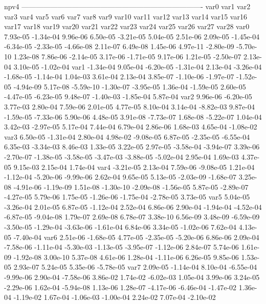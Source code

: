 npv4
----------------------------------------------------------------------------
var0 var1 var2 var3 var4 var5 var6 var7 var8 var9 var10 var11 var12 var13 var14 var15 var16 var17 var18 var19 var20 var21 var22 var23 var24 var25 var26 var27 var28 
var0  7.93e-05 -1.34e-04  9.96e-06  6.50e-05 -3.21e-05  5.04e-05  2.51e-06  2.09e-05 -1.45e-04 -6.34e-05 -2.33e-05 -4.66e-08  2.11e-07  6.49e-08  1.45e-06  4.97e-11 -2.80e-09 -5.70e-10  1.23e-08  7.86e-06 -2.14e-05  3.17e-06 -1.71e-05  9.17e-06  1.21e-05 -2.50e-07  2.13e-04  3.10e-05 -1.02e-04
var1 -1.34e-04  9.05e-04 -6.20e-05 -1.31e-04  2.13e-04 -3.26e-04 -1.68e-05 -1.14e-04  1.04e-03  3.61e-04  2.13e-04  3.85e-07 -1.10e-06 -1.97e-07 -1.52e-05 -4.94e-09  5.17e-08 -5.59e-10 -1.30e-07 -3.95e-05  1.36e-04 -1.59e-05  2.60e-05 -4.47e-05 -6.23e-05  9.48e-07 -1.40e-03 -1.85e-04  5.87e-04
var2  9.96e-06 -6.20e-05  3.77e-03  2.80e-04  7.59e-06  2.01e-05  4.77e-05  8.10e-04  3.14e-04 -8.82e-03  9.87e-04 -1.59e-05 -7.33e-06  5.90e-06  4.48e-05  3.91e-08 -7.73e-07  1.68e-08 -5.22e-07  1.04e-04  3.42e-03 -2.97e-05  5.17e-04  7.44e-04  6.79e-04  2.86e-06  1.68e-03  4.65e-04 -1.08e-02
var3  6.50e-05 -1.31e-04  2.80e-04  4.98e-02 -9.08e-05  6.87e-05 -2.35e-05 -6.55e-04  6.35e-03 -3.34e-03  8.46e-03  1.33e-05  3.22e-05  2.97e-05 -3.58e-04 -3.94e-07  3.39e-06 -2.70e-07 -1.38e-05 -3.58e-05 -3.47e-03 -3.88e-05 -5.02e-04  2.95e-04  1.69e-03  4.37e-05  9.15e-03  2.15e-04  1.74e-04
var4 -3.21e-05  2.13e-04  7.59e-06 -9.08e-05  1.21e-04 -1.12e-04 -5.20e-06 -9.99e-06  2.62e-04  9.65e-05  5.13e-05 -2.03e-09 -1.68e-07  3.25e-08 -4.91e-06 -1.19e-09  1.51e-08 -1.30e-10 -2.09e-08 -1.56e-05  5.87e-05 -2.89e-07 -4.27e-05  5.79e-06  1.75e-05 -1.26e-06 -1.75e-04 -2.78e-05  3.73e-05
var5  5.04e-05 -3.26e-04  2.01e-05  6.87e-05 -1.12e-04  2.52e-04  6.86e-06  2.90e-04 -1.94e-04 -4.52e-04 -6.87e-05 -9.04e-08  1.79e-07  2.69e-08  6.78e-07  3.38e-10  6.56e-09  3.48e-09 -6.59e-09 -3.50e-05 -1.29e-04 -3.63e-06 -1.61e-04  6.84e-06  3.34e-05 -1.02e-06  7.62e-04 4.13e-05 -7.40e-04
var6  2.51e-06 -1.68e-05  4.77e-05 -2.35e-05 -5.20e-06  6.86e-06  2.09e-04 -7.58e-06 -1.11e-04 -5.30e-03 -1.13e-05 -3.95e-07 -1.12e-06  2.84e-07  5.74e-06  1.61e-09 -1.92e-08  3.00e-10  5.37e-08  4.61e-06  1.28e-04 -1.11e-06  6.26e-05  9.85e-06  1.53e-05  2.93e-07  5.24e-05  5.35e-06 -5.78e-05
var7  2.09e-05 -1.14e-04  8.10e-04 -6.55e-04 -9.99e-06  2.90e-04 -7.58e-06  3.86e-02  1.74e-02 -6.02e-03  1.05e-04  3.99e-06  3.24e-05 -2.29e-06  1.62e-04 -5.94e-08  1.13e-06  1.28e-07 -4.17e-06 -6.46e-04 -1.47e-02  1.36e-04 -1.19e-02  1.67e-04 -1.06e-03 -1.00e-04  2.24e-02  7.07e-04 -2.10e-02
